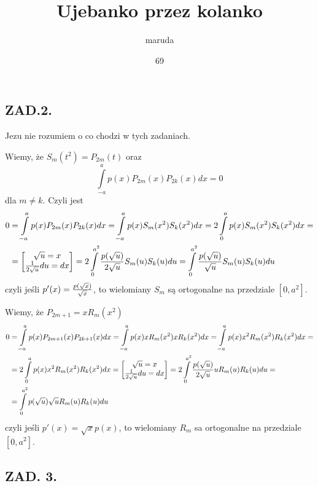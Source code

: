 \documentclass{article}[16pt]
\title{Ujebanko przez kolanko}
\date{69}
\author{maruda}
\begin{document}
\maketitle

\subsection*{ZAD.2.}

Jezu nie rozumiem o co chodzi w tych zadaniach.
\medskip

Wiemy, że $S_m(t^2)=P_{2m}(t)$ oraz
$$\int\limits_{-a}^ap(x)P_{2m}(x)P_{2k}(x)dx=0$$
dla $m\neq k$. Czyli jest
\begin{align*}
    0&=\int\limits_{-a}^ap(x)P_{2m}(x)P_{2k}(x)dx=\int\limits_{-a}^ap(x)S_m(x^2)S_k(x^2)dx=2\int\limits_0^ap(x)S_m(x^2)S_k(x^2)dx=\\
    &=\begin{bmatrix} \sqrt u=x\\ {1\over 2\sqrt u}du=dx\end{bmatrix}=2\int\limits_0^{a^2}{p(\sqrt u)\over 2\sqrt u}S_m(u)S_k(u)du=\int\limits_0^{a^2}{p(\sqrt u)\over \sqrt u}S_m(u)S_k(u)du
\end{align*}
czyli jeśli $p'(x)={p(\sqrt x)\over \sqrt x}$, to wielomiany $S_m$ są ortogonalne na przedziale $[0,a^2]$.
\bigskip

Wiemy, że $P_{2m+1}=xR_m(x^2)$ 
\begin{align*}
    0&=\int\limits_{-a}^ap(x)P_{2m+1}(x)P_{2k+1}(x)dx=\int\limits_{-a}^ap(x)xR_m(x^2)xR_k(x^2)dx=\int\limits_{-a}^ap(x)x^2R_m(x^2)R_k(x^2)dx=\\
    &=2\int\limits_0^ap(x)x^2R_m(x^2)R_k(x^2)dx=\begin{bmatrix}\sqrt u=x\\{1\over 2\sqrt u}du=dx\end{bmatrix}=2\int\limits_0^{a^2}{p(\sqrt u)\over 2\sqrt u}uR_m(u)R_k(u)du=\\
    &=\int\limits_0^{a^2}{p(\sqrt u)}\sqrt{u}R_m(u)R_k(u)du
\end{align*}
czyli jeśli $p'(x)=\sqrt xp(x)$, to wielomiany $R_m$ sa ortogonalne na przedziale $[0, a^2]$.

\subsection*{ZAD. 3.}


\end{document}
